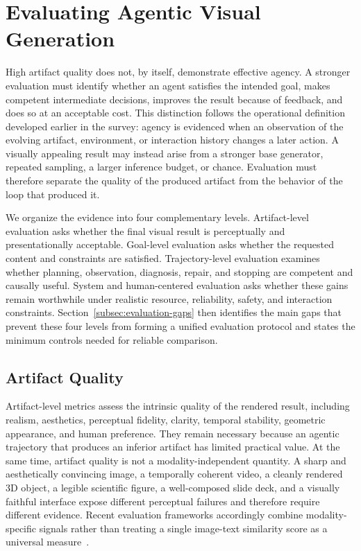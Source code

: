 \section{Evaluating Agentic Visual Generation}
\label{sec:evaluation}

High artifact quality does not, by itself, demonstrate effective agency. A stronger evaluation must identify whether an agent satisfies the intended goal, makes competent intermediate decisions, improves the result because of feedback, and does so at an acceptable cost. This distinction follows the operational definition developed earlier in the survey: agency is evidenced when an observation of the evolving artifact, environment, or interaction history changes a later action. A visually appealing result may instead arise from a stronger base generator, repeated sampling, a larger inference budget, or chance. Evaluation must therefore separate the quality of the produced artifact from the behavior of the loop that produced it.

We organize the evidence into four complementary levels. Artifact-level evaluation asks whether the final visual result is perceptually and presentationally acceptable. Goal-level evaluation asks whether the requested content and constraints are satisfied. Trajectory-level evaluation examines whether planning, observation, diagnosis, repair, and stopping are competent and causally useful. System and human-centered evaluation asks whether these gains remain worthwhile under realistic resource, reliability, safety, and interaction constraints. Section~\ref{subsec:evaluation-gaps} then identifies the main gaps that prevent these four levels from forming a unified evaluation protocol and states the minimum controls needed for reliable comparison.

\subsection{Artifact Quality}
\label{subsec:artifact-quality}

Artifact-level metrics assess the intrinsic quality of the rendered result, including realism, aesthetics, perceptual fidelity, clarity, temporal stability, geometric appearance, and human preference. They remain necessary because an agentic trajectory that produces an inferior artifact has limited practical value. At the same time, artifact quality is not a modality-independent quantity. A sharp and aesthetically convincing image, a temporally coherent video, a cleanly rendered 3D object, a legible scientific figure, a well-composed slide deck, and a visually faithful interface expose different perceptual failures and therefore require different evidence. Recent evaluation frameworks accordingly combine modality-specific signals rather than treating a single image-text similarity score as a universal measure~\cite{avg260329139,avg260530090,avg250913399,avg260601057,avg260526144,avg250407046}.

